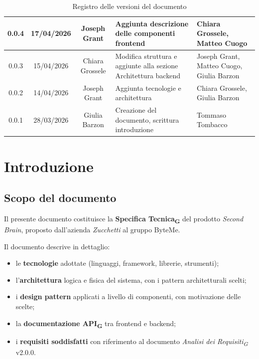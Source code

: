 \documentclass[11pt,a4paper]{article}
\newcommand{\gls}[1]{#1\textsubscript{G}}
\begin{document}
\begin{table}[H]
\begin{tabular}{|c|c|c|>{\raggedright\arraybackslash}p{}|p{}|}
        \hline
        0.0.4 & 17/04/2026 & Joseph Grant & Aggiunta descrizione delle componenti frontend & Chiara Grossele, Matteo Cuogo\\
        \hline
        0.0.3 & 15/04/2026 & Chiara Grossele & Modifica struttura e aggiunte alla sezione Architettura backend & Joseph Grant, Matteo Cuogo, Giulia Barzon \\
        \hline
        0.0.2 & 14/04/2026 & Joseph Grant & Aggiunta tecnologie e architettura & Chiara Grossele, Giulia Barzon\\
        \hline
        0.0.1 & 28/03/2026 & Giulia Barzon & Creazione del documento, scrittura introduzione & Tommaso Tombacco \\
        \hline
    \end{tabular}
    \caption{Registro delle versioni del documento}
    \label{tab:versionamento}
\end{table}
\newpage

\tableofcontents
\thispagestyle{empty}
\newpage

\setcounter{page}{1}

\section{Introduzione}
\subsection{Scopo del documento}
Il presente documento costituisce la \textbf{\gls{Specifica Tecnica}} del prodotto \textit{Second Brain}, proposto dall'azienda \textit{Zucchetti} al gruppo ByteMe.
 
Il documento descrive in dettaglio:
\begin{itemize}
  \item le \textbf{tecnologie} adottate (linguaggi, framework, librerie, strumenti);
  \item l'\textbf{architettura} logica e fisica del sistema, con i pattern architetturali scelti;
  \item i \textbf{design pattern} applicati a livello di componenti, con motivazione delle scelte;
  \item la \textbf{documentazione \gls{API}} tra frontend e backend;
  \item i \textbf{requisiti soddisfatti} con riferimento al documento \textit{\gls{Analisi dei Requisiti}} v2.0.0.
\end{itemize}
 
\end{document}
